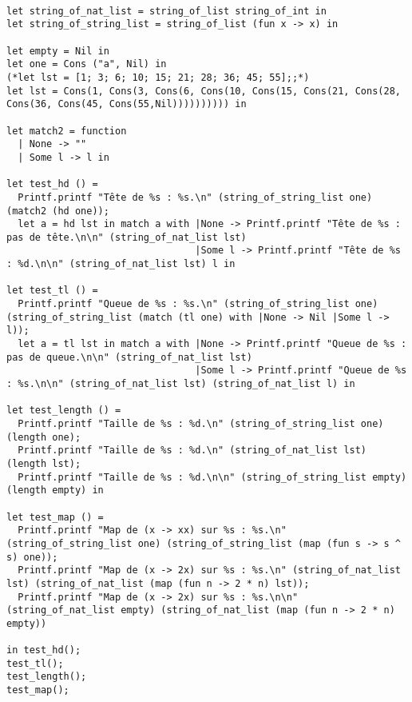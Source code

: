 \documentclass{report} %
\begin{document}
\begin{lstlisting}[language=caml]

let string_of_nat_list = string_of_list string_of_int in
let string_of_string_list = string_of_list (fun x -> x) in

let empty = Nil in
let one = Cons ("a", Nil) in
(*let lst = [1; 3; 6; 10; 15; 21; 28; 36; 45; 55];;*)
let lst = Cons(1, Cons(3, Cons(6, Cons(10, Cons(15, Cons(21, Cons(28, Cons(36, Cons(45, Cons(55,Nil)))))))))) in

let match2 = function
  | None -> ""
  | Some l -> l in

let test_hd () =
  Printf.printf "Tête de %s : %s.\n" (string_of_string_list one) (match2 (hd one));
  let a = hd lst in match a with |None -> Printf.printf "Tête de %s : pas de tête.\n\n" (string_of_nat_list lst)
                                 |Some l -> Printf.printf "Tête de %s : %d.\n\n" (string_of_nat_list lst) l in

let test_tl () =
  Printf.printf "Queue de %s : %s.\n" (string_of_string_list one) (string_of_string_list (match (tl one) with |None -> Nil |Some l -> l));
  let a = tl lst in match a with |None -> Printf.printf "Queue de %s : pas de queue.\n\n" (string_of_nat_list lst)
                                 |Some l -> Printf.printf "Queue de %s : %s.\n\n" (string_of_nat_list lst) (string_of_nat_list l) in

let test_length () =
  Printf.printf "Taille de %s : %d.\n" (string_of_string_list one) (length one);
  Printf.printf "Taille de %s : %d.\n" (string_of_nat_list lst) (length lst);
  Printf.printf "Taille de %s : %d.\n\n" (string_of_string_list empty) (length empty) in

let test_map () =
  Printf.printf "Map de (x -> xx) sur %s : %s.\n" (string_of_string_list one) (string_of_string_list (map (fun s -> s ^ s) one));
  Printf.printf "Map de (x -> 2x) sur %s : %s.\n" (string_of_nat_list lst) (string_of_nat_list (map (fun n -> 2 * n) lst));
  Printf.printf "Map de (x -> 2x) sur %s : %s.\n\n" (string_of_nat_list empty) (string_of_nat_list (map (fun n -> 2 * n) empty))
    
in test_hd();
test_tl();
test_length();
test_map();
\end{lstlisting}
\end{document}
